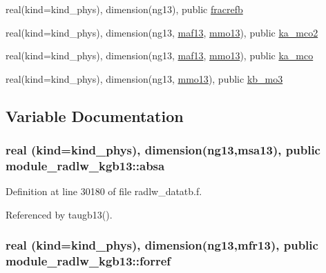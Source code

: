 \begin{DoxyCompactItemize}
\item 
real(kind=kind\+\_\+phys), dimension(ng13), public \hyperlink{namespacemodule__radlw__kgb13_a92d45aee9dab62549ea8821eae7422dd}{fracrefb}
\item 
real(kind=kind\+\_\+phys), dimension(ng13, \hyperlink{namespacemodule__radlw__kgb13_a1ddc025df872b12194b8c6344cc0204e}{maf13}, \hyperlink{namespacemodule__radlw__kgb13_ae513ce55829a57a0dbda77f570e4a619}{mmo13}), public \hyperlink{namespacemodule__radlw__kgb13_a523a0bc861ea861869f59b7bd007ff50}{ka\+\_\+mco2}
\item 
real(kind=kind\+\_\+phys), dimension(ng13, \hyperlink{namespacemodule__radlw__kgb13_a1ddc025df872b12194b8c6344cc0204e}{maf13}, \hyperlink{namespacemodule__radlw__kgb13_ae513ce55829a57a0dbda77f570e4a619}{mmo13}), public \hyperlink{namespacemodule__radlw__kgb13_a0c2f5802f9471c35759cb673dbc8ca05}{ka\+\_\+mco}
\item 
real(kind=kind\+\_\+phys), dimension(ng13, \hyperlink{namespacemodule__radlw__kgb13_ae513ce55829a57a0dbda77f570e4a619}{mmo13}), public \hyperlink{namespacemodule__radlw__kgb13_acc93fbdd9ce1062cbe9b01973d8ab229}{kb\+\_\+mo3}
\end{DoxyCompactItemize}


\subsection{Variable Documentation}
\subsubsection[{\texorpdfstring{absa}{absa}}]{\setlength{\rightskip}{0pt plus 5cm}real (kind=kind\+\_\+phys), dimension(ng13,{\bf msa13}), public module\+\_\+radlw\+\_\+kgb13\+::absa}\hypertarget{namespacemodule__radlw__kgb13_a22ce8d48ac3dceae1d52e80097fc2689}{}\label{namespacemodule__radlw__kgb13_a22ce8d48ac3dceae1d52e80097fc2689}


Definition at line 30180 of file radlw\+\_\+datatb.\+f.



Referenced by taugb13().

\subsubsection[{\texorpdfstring{forref}{forref}}]{\setlength{\rightskip}{0pt plus 5cm}real (kind=kind\+\_\+phys), dimension(ng13,{\bf mfr13}), public module\+\_\+radlw\+\_\+kgb13\+::forref}\hypertarget{namespacemodule__radlw__kgb13_a93c6546ef5f8cbfc4f63de29e1ba2452}{}\label{namespacemodule__radlw__kgb13_a93c6546ef5f8cbfc4f63de29e1ba2452}


